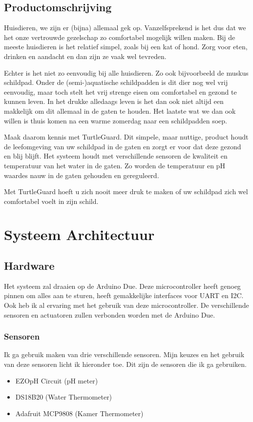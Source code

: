 \documentclass[a4paper]{report}
\newcommand{\turtleguard}{\mbox{TurtleGuard\texttrademark}\xspace}
\begin{document}
\section{Productomschrijving}
\label{section-product}
Huisdieren, we zijn er (bijna) allemaal gek op. Vanzelfsprekend is het dus dat we het onze vertrouwde gezelschap zo comfortabel mogelijk willen maken.
Bij de meeste huisdieren is het relatief simpel, \mbox{zoals} bij een kat of hond. Zorg voor eten, drinken en aandacht en dan zijn ze vaak wel tevreden.
\par \smallskip
Echter is het niet zo eenvoudig bij alle huisdieren. Zo ook bijvoorbeeld de muskus schildpad.
Onder de (semi-)aquatische schildpadden is dit dier nog wel vrij eenvoudig, maar toch stelt het vrij strenge eisen om comfortabel en gezond te kunnen leven.
In het drukke alledaags leven is het dan ook niet altijd een makkelijk om dit allemaal in de gaten te houden.
Het laatste wat we dan ook willen is thuis komen na een warme zomerdag naar een schildpadden soep.
\par \smallskip 
Maak daarom kennis met \turtleguard. Dit simpele, maar nuttige, product houdt de leefomgeving van uw schildpad in de gaten en zorgt er voor dat deze gezond en blij blijft.
Het systeem houdt met verschillende sensoren de kwaliteit en temperatuur van het water in de gaten. 
Zo worden de temperatuur en pH waardes nauw in de gaten gehouden en gereguleerd.
\par \smallskip 
Met \turtleguard hoeft u zich nooit meer druk te maken of uw schildpad zich wel comfortabel voelt in zijn schild. 

\chapter{Systeem Architectuur}
\section{Hardware}
Het systeem zal draaien op de Arduino Due. Deze microcontroller heeft genoeg pinnen om alles aan te sturen, heeft gemakkelijke interfaces voor UART en I2C. Ook heb ik al ervaring met het gebruik van deze microcontroller.
De verschillende sensoren en actuatoren zullen verbonden worden met de Arduino Due. 

\subsection{Sensoren}
Ik ga gebruik maken van drie verschillende sensoren. Mijn keuzes en het gebruik van deze sensoren licht ik hieronder toe.
Dit zijn de sensoren die ik ga gebruiken.
\begin{itemize}
  \item EZO\texttrademark \space pH Circuit (pH meter)
  \item DS18B20 (Water Thermometer)
  \item Adafruit MCP9808 (Kamer Thermometer)
\end{itemize}
\end{document}

